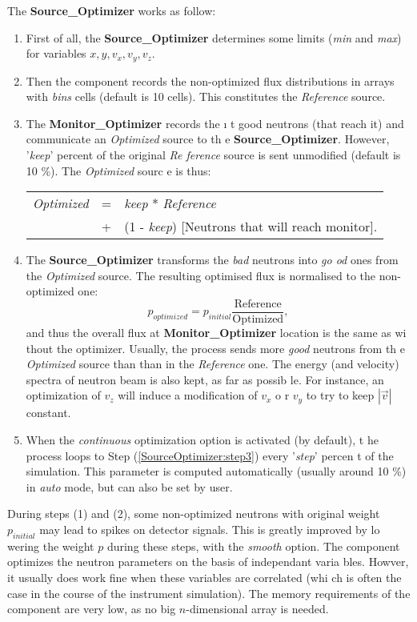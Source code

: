 \documentclass[12pt]{report}
\begin{document}
The {\bf Source\_Optimizer} works as follow:
\begin{enumerate}
\item{First of all, the {\bf Source\_Optimizer} determines some limits ({\it min
} and {\it max}) for variables $x, y, v_x, v_y, v_z$.}
\item{Then the component records the non-optimized flux distributions in arrays 
with {\it bins} cells (default is 10 cells). This constitutes the {\it Reference
} source.}
\item{\label {SourceOptimizer:step3}The {\bf Monitor\_Optimizer} records the {\i
t good} neutrons (that reach it) and communicate an {\it Optimized} source to th
e {\bf Source\_Optimizer}. However, '{\it keep}' percent of the original {\it Re
ference} source is sent unmodified (default is 10 \%). The {\it Optimized} sourc
e is thus: 

\begin{center}
\begin{tabular}{rcl}
{\it Optimized} & = & {\it keep} * {\it Reference} \\
& + & (1 - {\it keep}) [Neutrons that will reach monitor].
\end{tabular}
\end{center}
}
\item{The {\bf Source\_Optimizer} transforms the {\it bad} neutrons into {\it go
od} ones from the {\it Optimized} source. 
The resulting optimised flux is normalised to the non-optimized one:
\begin{equation}
p_{optimized} = p_{initial} \frac{\mbox{Reference}}{\mbox{Optimized}},
\end{equation}
and thus the overall flux at {\bf Monitor\_Optimizer} location is the same as wi
thout the optimizer. Usually, the process sends more {\it good} neutrons from th
e {\it Optimized} source than than in the {\it Reference} one.
The energy (and velocity) spectra of neutron beam is also kept, as far as possib
le. For instance, an optimization of $v_z$ will induce a modification of $v_x$ o
r $v_y$ to try to keep $|\vec{v}|$ constant.
}
\item{When the {\it continuous} optimization option is activated (by default), t
he process loops to Step (\ref{SourceOptimizer:step3}) every '{\it step}' percen
t of the simulation. This parameter is computed automatically (usually around 10
 \%) in {\it auto} mode, but can also be set by user.}
\end{enumerate}

During steps (1) and (2), some non-optimized neutrons with original weight $p_{i
nitial}$ may  lead to spikes on detector signals. This is greatly improved by lo
wering the weight $p$ during these steps, with the {\it smooth} option.
The component optimizes the neutron parameters on the basis of independant varia
bles. Howver, it usually does work fine when these variables are correlated (whi
ch is often the case in the course of the instrument simulation).
The memory requirements of the component are very low, as no big $n$-dimensional
 array is needed.
\end{document}
